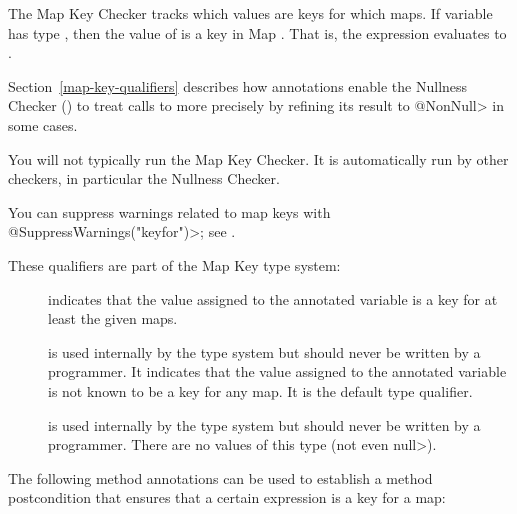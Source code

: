 \htmlhr
{}

The Map Key Checker tracks which values are keys for which maps.  If variable
 has type , then the value of  is a key
in Map .  That is, the expression  evaluates to
.

Section~\ref{map-key-qualifiers} describes how  annotations
enable the
Nullness Checker () to treat calls to
more precisely by refining its result to \<@NonNull> in some cases.

You will not typically run the Map Key Checker.  It is automatically run by
other checkers, in particular the Nullness Checker.

You can suppress warnings related to map keys with
\<@SuppressWarnings("keyfor")>; see .


These qualifiers are part of the Map Key type system:

\begin{description}

\item[]
  indicates that the value assigned to the annotated variable is a key for at
  least the given maps.

\item[]
  is used internally by the type system but should never be written by a
  programmer.  It indicates that the value assigned to the annotated
  variable is not known to be a key for any map.  It is the default type
  qualifier.

\item[]
  is used internally by the type system but should never be written by a
  programmer.  There are no values of this type (not even \<null>).

\end{description}

The following method annotations can be used to establish a method postcondition
that ensures that a certain expression is a key for a map:

